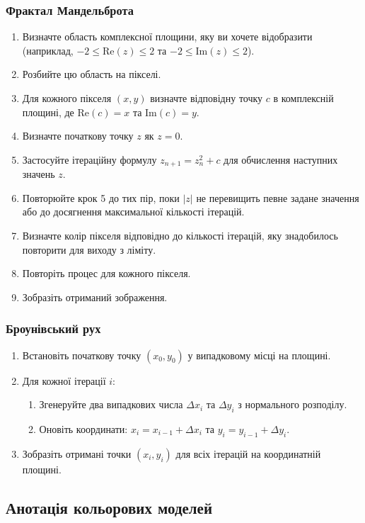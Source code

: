 \documentclass[oneside,14pt]{extarticle}
\begin{document}
\begin{normalsize}
	\subsubsection{Фрактал Мандельброта}
	\begin{enumerate}
		\item Визначте область комплексної площини, яку ви хочете відобразити (наприклад, $-2 \leq \text{Re}(z) \leq 2$ та $-2 \leq \text{Im}(z) \leq 2$).
		\item Розбийте цю область на пікселі.
		\item Для кожного пікселя $(x, y)$ визначте відповідну точку $c$ в комплексній площині, де $\text{Re}(c) = x$ та $\text{Im}(c) = y$.
		\item Визначте початкову точку $z$ як $z = 0$.
		\item Застосуйте ітераційну формулу $z_{n+1} = z_n^2 + c$ для обчислення наступних значень $z$.
		\item Повторюйте крок 5 до тих пір, поки $|z|$ не перевищить певне задане значення або до досягнення максимальної кількості ітерацій.
		\item Визначте колір пікселя відповідно до кількості ітерацій, яку знадобилось повторити для виходу з ліміту.
		\item Повторіть процес для кожного пікселя.
		\item Зобразіть отриманий зображення.
	\end{enumerate}
	
	\subsubsection{Броунівський рух}
	\begin{enumerate}
		\item Встановіть початкову точку $(x_0, y_0)$ у випадковому місці на площині.
		\item Для кожної ітерації $i$:
		\begin{enumerate}
			\item Згенеруйте два випадкових числа $\Delta x_i$ та $\Delta y_i$ з нормального розподілу.
			\item Оновіть координати: $x_i = x_{i-1} + \Delta x_i$ та $y_i = y_{i-1} + \Delta y_i$.
		\end{enumerate}
		\item Зобразіть отримані точки $(x_i, y_i)$ для всіх ітерацій на координатній площині.
	\end{enumerate}
	
	\subsection{Анотація кольорових моделей}

\end{normalsize}
\end{document}
